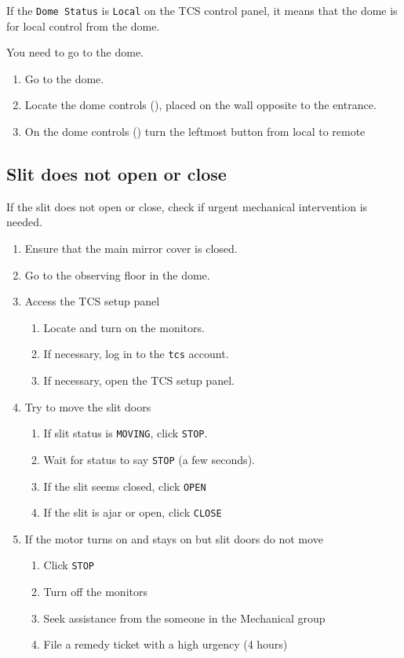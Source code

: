 \documentclass[11pt,fleqn,a4paper]{book}
\begin{document}
If the \texttt{Dome Status} is \texttt{Local} on the \gls{TCS control panel}, it means that the dome is for local control from the dome.

You need to go to the \gls{dome}.

\begin{enumerate}
   \item Go to the dome.
   \item Locate the dome controls (), placed on the wall opposite to the entrance.
   \item On the dome controls () turn the leftmost button from local to remote
\end{enumerate}

\subsection{Slit does not open or close}
If the slit does not open or close, check if urgent mechanical intervention is needed.

\begin{enumerate}
    \item Ensure that the main mirror cover is closed.
    \item Go to the observing floor in the \gls{dome}.
    \item Access the \gls{TCS setup panel}
        \begin{enumerate}
            \item Locate and turn on the monitors.
            \item If necessary, log in to the \texttt{tcs} account.
            \item If necessary, open the \gls{TCS setup panel}.
        \end{enumerate}
    \item Try to move the slit doors
        \begin{enumerate}
            \item If slit status is \texttt{MOVING}, click \texttt{STOP}.
            \item Wait for status to say \texttt{STOP} (a few seconds).
            \item If the slit seems closed, click \texttt{OPEN}
            \item If the slit is ajar or open, click \texttt{CLOSE}
        \end{enumerate}
    \item If the motor turns on and stays on but slit doors do not move
        \begin{enumerate}
            \item Click \texttt{STOP}
            \item Turn off the monitors
            \item Seek assistance from the someone in the Mechanical group
            \item File a remedy ticket with a high urgency (4 hours)
        \end{enumerate}
\end{enumerate}
\end{document}
